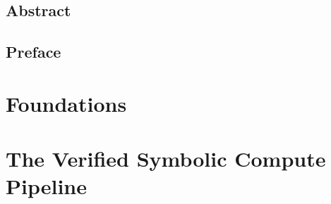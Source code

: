 \documentclass[11pt,letterpaper,twoside,openright]{report}
\begin{document}


\setcounter{page}{1}

\chapter*{Abstract}


\chapter*{Preface}


\tableofcontents
\listoffigures
\listoftables

\setcounter{page}{1}

\part{Foundations}
\label{part:foundations}







\part{The Verified Symbolic Compute Pipeline}
\label{part:pipeline}














\end{document}
